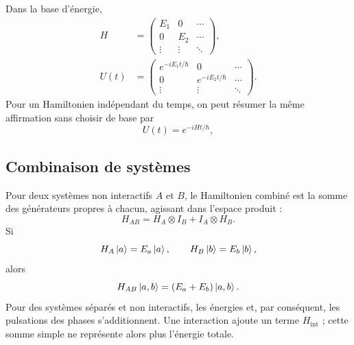 Dans la base d’énergie,
\begin{equation}
\begin{aligned}
H&=
\begin{pmatrix}
E_1&0&\cdots\\
0&E_2&\cdots\\
\vdots&\vdots&\ddots
\end{pmatrix},\\[0.6em]
U(t)&=
\begin{pmatrix}
e^{-iE_1t/\hbar}&0&\cdots\\
0&e^{-iE_2t/\hbar}&\cdots\\
\vdots&\vdots&\ddots
\end{pmatrix}.
\end{aligned}
\end{equation}
Pour un Hamiltonien indépendant du temps, on peut résumer la même affirmation sans choisir de base par
\begin{equation}
\boxed{U(t)=e^{-iHt/\hbar}},
\end{equation}

\begin{classroomqa}
\end{classroomqa}

\subsection{Combinaison de systèmes}

Pour deux systèmes non interactifs \(A\) et \(B\), le Hamiltonien combiné est la somme des générateurs propres à chacun, agissant dans l’espace produit :
\begin{equation}
H_{AB}
=
H_A\otimes I_B+I_A\otimes H_B.
\end{equation}
Si
\begin{equation}
H_A\left\lvert a\right\rangle=E_a\left\lvert a\right\rangle,
\qquad
H_B\left\lvert b\right\rangle=E_b\left\lvert b\right\rangle,
\end{equation}
alors
\begin{equation}
H_{AB}\left\lvert a,b\right\rangle=(E_a+E_b)\left\lvert a,b\right\rangle.
\end{equation}
Pour des systèmes séparés et non interactifs, les énergies et, par conséquent, les pulsations des phases s’additionnent. Une interaction ajoute un terme \(H_{\mathrm{int}}\) ; cette somme simple ne représente alors plus l’énergie totale.

